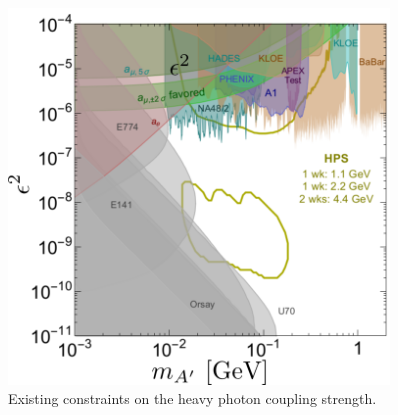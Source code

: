 
\begin{figure}[t]
    \centering
    \includegraphics[width=0.9\textwidth]{images/ap_current_limits.png}
    \caption{Existing constraints on the heavy photon coupling strength.}
    \label{fig:ap_limits}
\end{figure}
